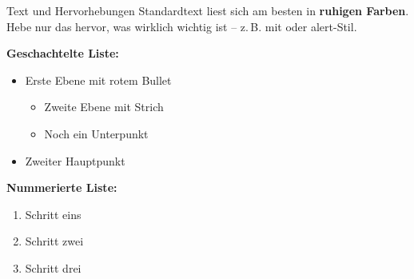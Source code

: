 \begin{frame}{Text und Hervorhebungen}
  Standardtext liest sich am besten in \textbf{ruhigen Farben}. Hebe nur das
  hervor, was wirklich wichtig ist – z.\,B. mit  oder
  \alert{alert-Stil}.

  \vspace{0.8em}
  \textbf{Geschachtelte Liste:}
  \begin{itemize}
    \item Erste Ebene mit rotem Bullet
    \begin{itemize}
      \item Zweite Ebene mit Strich
      \item Noch ein Unterpunkt
    \end{itemize}
    \item Zweiter Hauptpunkt
  \end{itemize}

  \vspace{0.4em}
  \textbf{Nummerierte Liste:}
  \begin{enumerate}
    \item Schritt eins
    \item Schritt zwei
    \item Schritt drei
  \end{enumerate}
\end{frame}